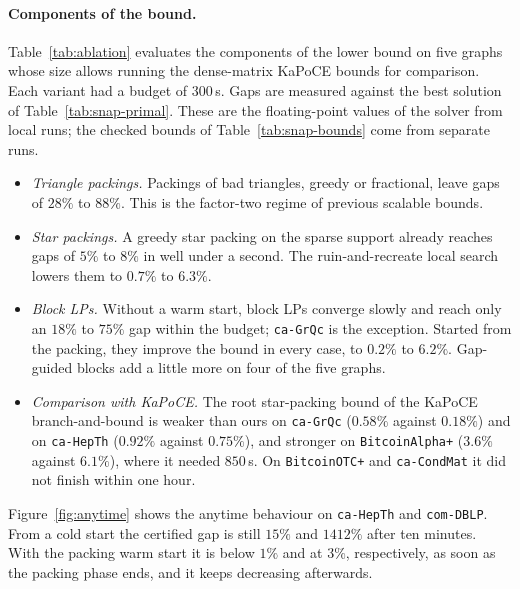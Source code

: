 \paragraph{Components of the bound.}  Table~\ref{tab:ablation} evaluates the
components of the lower bound on five graphs whose size allows running the
dense-matrix KaPoCE bounds for comparison.  Each variant had a budget of
$300$\,s.  Gaps are measured against the best solution of
Table~\ref{tab:snap-primal}.  These are the floating-point values of the
solver from local runs; the checked bounds of Table~\ref{tab:snap-bounds} come
from separate runs.
\begin{itemize}
\item \emph{Triangle packings.}  Packings of bad triangles, greedy or
fractional, leave gaps of $28\%$ to $88\%$.  This is the factor-two regime of
previous scalable bounds.
\item \emph{Star packings.}  A greedy star packing on the sparse support
already reaches gaps of $5\%$ to $8\%$ in well under a second.  The
ruin-and-recreate local search lowers them to $0.7\%$ to $6.3\%$.
\item \emph{Block LPs.}  Without a warm start, block LPs converge slowly and
reach only an $18\%$ to $75\%$ gap within the budget; \texttt{ca-GrQc} is
the exception.  Started from the packing, they improve the bound in every
case, to $0.2\%$ to $6.2\%$.  Gap-guided blocks add a little more on four of the five graphs.
\item \emph{Comparison with KaPoCE.}  The root star-packing bound of the
KaPoCE branch-and-bound is weaker than ours on \texttt{ca-GrQc} ($0.58\%$
against $0.18\%$) and on \texttt{ca-HepTh} ($0.92\%$ against $0.75\%$), and
stronger on \texttt{BitcoinAlpha+} ($3.6\%$ against
$6.1\%$), where it needed $850$\,s.  On \texttt{BitcoinOTC+} and
\texttt{ca-CondMat} it did not finish within one hour.
\end{itemize}

\begin{table}[!tbp]
\centering
\caption{Ablation of the lower bound (budget $300$\,s per variant): certified
gap to the best known solution and running time.  ``--'': did not finish
within one hour.}
\label{tab:ablation}
\scriptsize
\setlength{\tabcolsep}{3pt}
\resizebox{\textwidth}{!}{}
\end{table}

Figure~\ref{fig:anytime} shows the anytime behaviour on \texttt{ca-HepTh} and
\texttt{com-DBLP}.  From a cold start the certified gap is still $15\%$ and
$1412\%$ after ten minutes.  With the packing warm start it is below $1\%$
and at $3\%$, respectively, as soon as the packing phase ends, and it keeps
decreasing afterwards.

